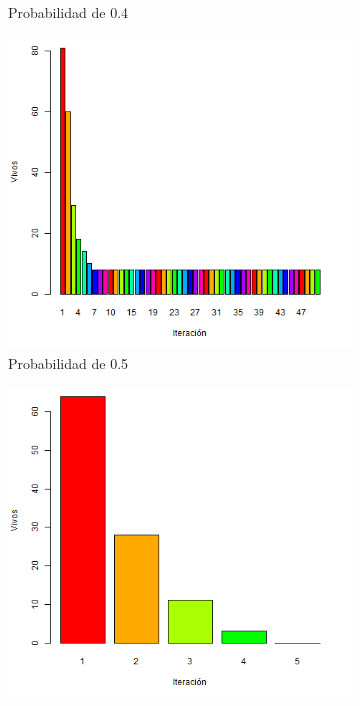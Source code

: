 \documentclass{article}
\begin{document}
\begin{figure}
\begin{subfigure}[b]{0.4\linewidth}
\caption{Probabilidad de 0.4}
\label{prob4}
\end{subfigure}
\begin{subfigure}[b]{0.4\linewidth}
\includegraphics[width=\linewidth]{prob0-5.png}
\caption{Probabilidad de 0.5}
\label{prob5}
\end{subfigure}
\begin{subfigure}[b]{0.4\linewidth}
\includegraphics[width=\linewidth]{prob0-6.png}

\end{subfigure}
\end{figure}
\end{document}
